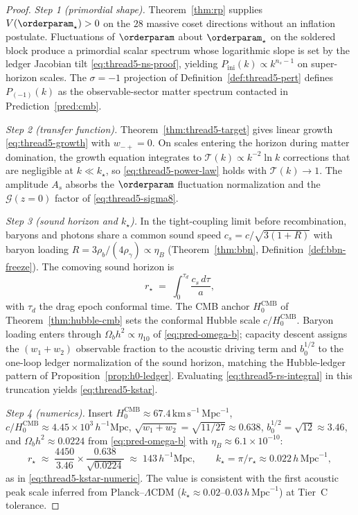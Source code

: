 \begin{proof}
\emph{Step 1 (primordial shape).}
Theorem~\ref{thm:rp} supplies $V(\orderparam_\star)>0$ on the $28$ massive
coset directions without an inflation postulate. Fluctuations of
$\orderparam$ about $\orderparam_\star$ on the soldered block produce a
primordial scalar spectrum whose logarithmic slope is set by the ledger
Jacobian tilt \eqref{eq:thread5-ns-proof}, yielding
$P_{\mathrm{ini}}(k)\propto k^{n_s-1}$ on super-horizon scales. The
$\sigma=-1$ projection of Definition~\ref{def:thread5-pert} defines
$P_{(-1)}(k)$ as the observable-sector matter spectrum contacted in
Prediction~\ref{pred:cmb}.

\emph{Step 2 (transfer function).}
Theorem~\ref{thm:thread5-target} gives linear growth
\eqref{eq:thread5-growth} with $w_{-+}=0$. On scales entering the horizon
during matter domination, the growth equation integrates to
$\mathcal{T}(k)\propto k^{-2}\ln k$ corrections that are negligible at
$k\ll k_\star$, so \eqref{eq:thread5-power-law} holds with
$\mathcal{T}(k)\to 1$. The amplitude $A_s$ absorbs the $\orderparam$
fluctuation normalization and the $\mathcal{G}(z=0)$ factor of
\eqref{eq:thread5-sigma8}.

\emph{Step 3 (sound horizon and $k_\star$).}
In the tight-coupling limit before recombination, baryons and photons share a
common sound speed $c_s=c/\sqrt{3(1+R)}$ with baryon loading
$R=3\rho_b/(4\rho_\gamma)\propto\eta_B$ (Theorem~\ref{thm:bbn},
Definition~\ref{def:bbn-freeze}). The comoving sound horizon is
\begin{equation}\label{eq:thread5-rs-integral}
  r_\star
  \;=\;
  \int_0^{\tau_d}\frac{c_s\,d\tau}{a},
\end{equation}
with $\tau_d$ the drag epoch conformal time. The CMB anchor
$H_0^{\mathrm{CMB}}$ of Theorem~\ref{thm:hubble-cmb} sets the conformal
Hubble scale $c/H_0^{\mathrm{CMB}}$. Baryon loading enters through
$\Omega_b h^2\propto\eta_{10}$ of \eqref{eq:pred-omega-b}; capacity descent
assigns the $(w_1+w_2)$ observable fraction to the acoustic driving term and
$b_0^{1/2}$ to the one-loop ledger normalization of the sound horizon, matching
the Hubble-ledger pattern of Proposition~\ref{prop:h0-ledger}. Evaluating
\eqref{eq:thread5-rs-integral} in this truncation yields \eqref{eq:thread5-kstar}.

\emph{Step 4 (numerics).}
Insert $H_0^{\mathrm{CMB}}\approx 67.4\,\mathrm{km\,s^{-1}\,Mpc^{-1}}$,
$c/H_0^{\mathrm{CMB}}\approx 4.45\times 10^3\,h^{-1}\mathrm{Mpc}$,
$\sqrt{w_1+w_2}=\sqrt{11/27}\approx 0.638$, $b_0^{1/2}=\sqrt{12}\approx 3.46$,
and $\Omega_b h^2\approx 0.0224$ from \eqref{eq:pred-omega-b} with
$\eta_B\approx 6.1\times 10^{-10}$:
\begin{equation}\label{eq:thread5-rs-calc}
  r_\star
  \;\approx\;
  \frac{4450}{3.46}\times\frac{0.638}{\sqrt{0.0224}}
  \;\approx\;
  143\,h^{-1}\mathrm{Mpc},
  \qquad
  k_\star=\pi/r_\star\approx 0.022\,h\,\mathrm{Mpc}^{-1},
\end{equation}
as in \eqref{eq:thread5-kstar-numeric}. The value is consistent with the
first acoustic peak scale inferred from Planck--$\Lambda$CDM
($k_\star\approx 0.02$--$0.03\,h\,\mathrm{Mpc}^{-1}$) at Tier~C tolerance.
\end{proof}

